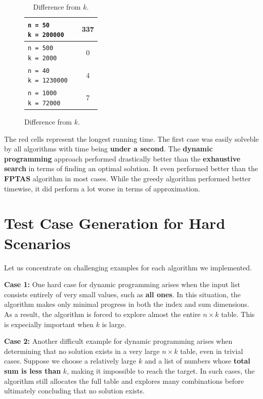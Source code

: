 \documentclass[11pt]{article}
\begin{document}
\begin{figure}[!hbpt]
\begin{minipage}{0.35\textwidth}
\begin{table}[H]
\begin{tabular}{|l|c|c|}
                \makecell[l]{ \texttt{n = 50} \\ \texttt{k = 200000}} &  \cellcolor{red!20}{19516} & 337 \\ \hline
                \makecell[l]{ \texttt{n = 500} \\ \texttt{k = 2000}} &  \cellcolor{red!20}{34} & 0 \\ \hline
                \makecell[l]{ \texttt{n = 40} \\ \texttt{k = 1230000}} &  \cellcolor{red!20}{33687} & 4 \\ \hline
                \makecell[l]{ \texttt{n = 1000} \\ \texttt{k = 72000}} & \cellcolor{red!20}{897} & 7 \\ \hline
            \end{tabular}
            \caption{Difference from $k$.}
        \end{table} 
    \end{minipage}  
\end{figure}

The red cells represent the longest running time. The first case was easily solveble by all algorithms with time being \textbf{under a second}. The \textbf{dynamic programming} approach performed drastically better than the \textbf{exhaustive search} in terms of finding an optimal solution. It even performed better than the \textbf{FPTAS} algorithm in most cases. While the greedy algorithm performed better timewise, it did perform a lot worse in terms of approximation.

\section{Test Case Generation for Hard Scenarios}

Let us concentrate on challenging examples for each algorithm we implemented.

\textbf{Case 1:} One hard case for dynamic programming arises when the input list consists entirely of very small values, such as \textbf{all ones}. In this situation, the algorithm makes only minimal progress in both the index and sum dimensions. As a result, the algorithm is forced to explore almost the entire $n \times k$ table. This is expecially important when $k$ is large. 

\textbf{Case 2:} Another difficult example for dynamic programming arises when determining that no solution exists in a very large $n \times k$ table, even in trivial cases. Suppose we choose a relatively large $k$ and a list of numbers whose \textbf{total sum is less than} $k$, making it impossible to reach the target. In such cases, the algorithm still allocates the full table and explores many combinations before ultimately concluding that no solution exists. 
\end{document}
